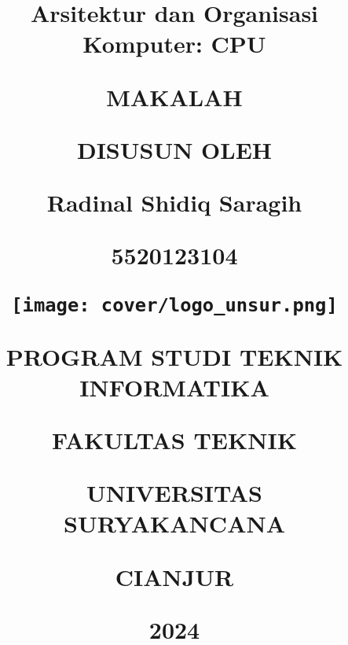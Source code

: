 \title{

  {\Huge{Arsitektur dan Organisasi Komputer: CPU}}

  {\large{MAKALAH}}

  {\normalsize{DISUSUN OLEH}}

  {\Large{Radinal Shidiq Saragih}}

  {\normalsize{5520123104}}

  {\vspace{1cm}}
  {\texttt{[image: cover/logo\_unsur.png]}}
  {\vspace{1cm}}

  {\large{PROGRAM STUDI TEKNIK INFORMATIKA}}

  {\large{FAKULTAS TEKNIK}}

  {\large{UNIVERSITAS SURYAKANCANA}}

  {\large{CIANJUR}}

  {\small{2024}}
}
